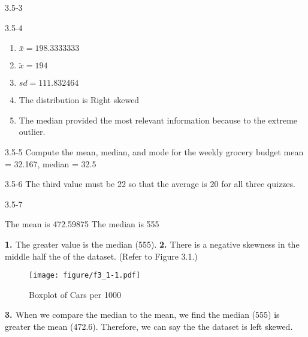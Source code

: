 \begin{exsol@solution}{3.5-3}


\end{exsol@solution}
\begin{exsol@solution}{3.5-4}
\begin{enumerate}
\item $\bar{x} = 198.3333333$
\item $\tilde{x} = 194$
\item $sd = 111.832464 $
\item The distribution is Right skewed
\item The median provided the most relevant information because to the extreme outlier.
\end{enumerate}

\end{exsol@solution}
\begin{exsol@solution}{3.5-5}
	Compute the mean, median, and mode for the weekly grocery budget
	mean = 32.167, median = 32.5

\end{exsol@solution}
\begin{exsol@solution}{3.5-6}
	The third value must be 22 so that the average is 20 for all three quizzes.

\end{exsol@solution}
\begin{exsol@solution}{3.5-7}



    The mean is 472.59875
    The median is 555

{\bf{1. }} The greater value is the median (555).  {\bf{2. }} There is a negative skewness in the middle half the of the dataset.  (Refer to Figure 3.1.)

\begin{figure}[htbp] %
   \centering
   \texttt{[image: figure/f3\_1-1.pdf]}
   \caption{Boxplot of Cars per 1000}
   \label{fig:f3_1}
\end{figure}

{\bf{3. }} When we compare the median to the mean, we find the median (555) is greater the mean (472.6).  Therefore, we can say the the dataset is left skewed.

\end{exsol@solution}

